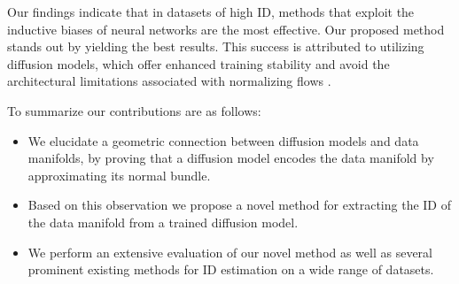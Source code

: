 Our findings indicate that in datasets of high ID, methods that exploit the inductive biases of neural networks are the most effective. Our proposed method stands out by yielding the best results. This success is attributed to utilizing diffusion models, which offer enhanced training stability and avoid the architectural limitations associated with normalizing flows \cite{behrmann2021understandin}.

To summarize our contributions are as follows:
\begin{itemize}
    \item We elucidate a geometric connection between diffusion models and data manifolds, by proving that a diffusion model encodes the data manifold by approximating its normal bundle.
    \item Based on this observation we propose a novel method for extracting the ID of the data manifold from a trained diffusion model.
    \item We perform an extensive evaluation of our novel method as well as several prominent existing methods for ID estimation on a wide range of datasets.
\end{itemize}

